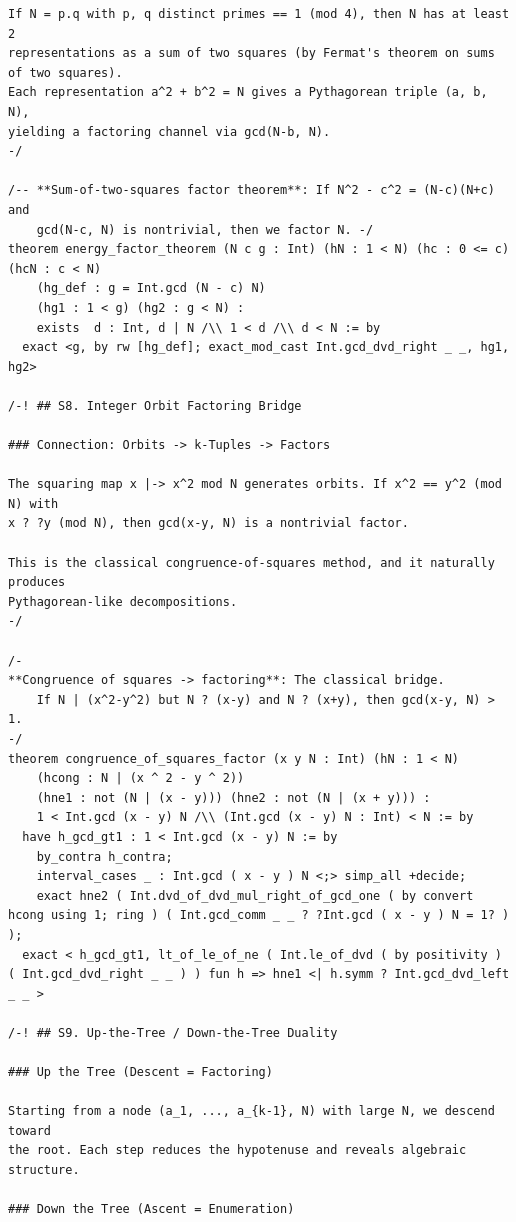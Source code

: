 \documentclass[11pt,openright,twoside]{book}
\theoremstyle{definition}
\begin{document}
\begin{lstlisting}[style=lean]
If N = p.q with p, q distinct primes == 1 (mod 4), then N has at least 2
representations as a sum of two squares (by Fermat's theorem on sums of two squares).
Each representation a^2 + b^2 = N gives a Pythagorean triple (a, b, N),
yielding a factoring channel via gcd(N-b, N).
-/

/-- **Sum-of-two-squares factor theorem**: If N^2 - c^2 = (N-c)(N+c) and
    gcd(N-c, N) is nontrivial, then we factor N. -/
theorem energy_factor_theorem (N c g : Int) (hN : 1 < N) (hc : 0 <= c) (hcN : c < N)
    (hg_def : g = Int.gcd (N - c) N)
    (hg1 : 1 < g) (hg2 : g < N) :
    exists  d : Int, d | N /\\ 1 < d /\\ d < N := by
  exact <g, by rw [hg_def]; exact_mod_cast Int.gcd_dvd_right _ _, hg1, hg2>

/-! ## S8. Integer Orbit Factoring Bridge

### Connection: Orbits -> k-Tuples -> Factors

The squaring map x |-> x^2 mod N generates orbits. If x^2 == y^2 (mod N) with
x ? ?y (mod N), then gcd(x-y, N) is a nontrivial factor.

This is the classical congruence-of-squares method, and it naturally produces
Pythagorean-like decompositions.
-/

/-
**Congruence of squares -> factoring**: The classical bridge.
    If N | (x^2-y^2) but N ? (x-y) and N ? (x+y), then gcd(x-y, N) > 1.
-/
theorem congruence_of_squares_factor (x y N : Int) (hN : 1 < N)
    (hcong : N | (x ^ 2 - y ^ 2))
    (hne1 : not (N | (x - y))) (hne2 : not (N | (x + y))) :
    1 < Int.gcd (x - y) N /\\ (Int.gcd (x - y) N : Int) < N := by
  have h_gcd_gt1 : 1 < Int.gcd (x - y) N := by
    by_contra h_contra;
    interval_cases _ : Int.gcd ( x - y ) N <;> simp_all +decide;
    exact hne2 ( Int.dvd_of_dvd_mul_right_of_gcd_one ( by convert hcong using 1; ring ) ( Int.gcd_comm _ _ ? ?Int.gcd ( x - y ) N = 1? ) );
  exact < h_gcd_gt1, lt_of_le_of_ne ( Int.le_of_dvd ( by positivity ) ( Int.gcd_dvd_right _ _ ) ) fun h => hne1 <| h.symm ? Int.gcd_dvd_left _ _ >

/-! ## S9. Up-the-Tree / Down-the-Tree Duality

### Up the Tree (Descent = Factoring)

Starting from a node (a_1, ..., a_{k-1}, N) with large N, we descend toward
the root. Each step reduces the hypotenuse and reveals algebraic structure.

### Down the Tree (Ascent = Enumeration)


\end{lstlisting}
\end{document}
